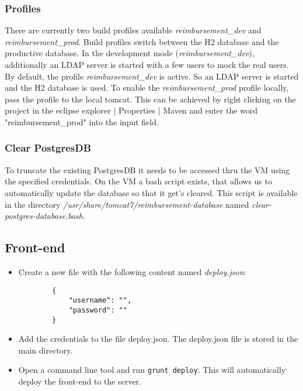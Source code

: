 \subsubsection{Profiles}
There are currently two build profiles available \textit{reimbursement_dev} and \textit{reimbursement_prod}. Build profiles switch between the H2 database and the productive database. In the development mode (\textit{reimbursement_dev}), additionally an LDAP server is started with a few users to mock the real users.\newline
By default, the profile \textit{reimbursement_dev} is active. So an LDAP server is started and the H2 database is used. To enable the \textit{reimbursement_prod} profile locally, pass the profile to the local tomcat. This can be achieved by right clicking on the project in the eclipse explorer | Properties | Maven and enter the word "reimbursement_prod" into the input field.

\subsubsection{Clear PostgresDB}
\label{sec:clear-postgresdb}
To truncate the existing PostgresDB it needs to be accessed thru the VM using the specified credentials. On the VM a bash script exists, that allows us to automatically update the database so that it get's cleared. This script is available in the directory \textit{/usr/share/tomcat7/reimbursement-database} named \textit{clear-postgres-database.bash}.

\subsection{Front-end}

\begin{itemize}

    \item Create a new file with the following content named \textit{deploy.json}:
    \begin{lstlisting}
        {
            "username": "",
            "password": ""
        }
    \end{lstlisting}
    \item Add the credentials to the file deploy.json. The deploy.json file is stored in the main directory.
    \item Open a command line tool and run \texttt{grunt deploy}. This will automatically deploy the front-end to the server.

\end{itemize}

